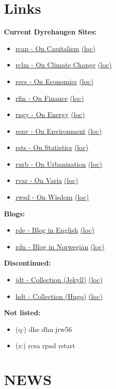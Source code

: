 \documentclass[
]{book}
\providecommand{\tightlist}{%
  \setlength{\itemsep}{0pt}\setlength{\parskip}{0pt}}
\begin{document}
\hypertarget{links}{%
\chapter{Links}\label{links}}

\textbf{Current Dyrehaugen Sites:}

\begin{itemize}
\tightlist
\item
  \href{https://dyrehaugen.github.io/rcap}{rcap - On Capitalism} \href{http://localhost/rcap}{(loc)}
\item
  \href{https://dyrehaugen.github.io/rclm}{rclm - On Climate Change} \href{http://localhost/rclm}{(loc)}
\item
  \href{https://dyrehaugen.github.io/recs}{recs - On Economics} \href{http://localhost/recs}{(loc)}
\item
  \href{https://dyrehaugen.github.io/rngy}{rfin - On Finance} \href{http://localhost/rfin}{(loc)}
\item
  \href{https://dyrehaugen.github.io/rngy}{rngy - On Energy} \href{http://localhost/rngy}{(loc)}
\item
  \href{https://dyrehaugen.github.io/renv}{renv - On Environment} \href{http://localhost/renv}{(loc)}
\item
  \href{https://dyrehaugen.github.io/rsts}{rsts - On Statistics} \href{http://localhost/rsts}{(loc)}
\item
  \href{https://dyrehaugen.github.io/rurb}{rurb - On Urbanization} \href{http://localhost/rurb}{(loc)}
\item
  \href{https://dyrehaugen.github.io/rvar}{rvar - On Varia} \href{http://localhost/rvar}{(loc)}
\item
  \href{https://dyrehaugen.github.io/rwsd}{rwsd - On Wisdom} \href{http://localhost/rwsd}{(loc)}
\end{itemize}

\textbf{Blogs:}

\begin{itemize}
\tightlist
\item
  \href{https://dyrehaugen.github.io/rde}{rde - Blog in English} \href{http://localhost/rde}{(loc)}
\item
  \href{https://dyrehaugen.github.io/rdn}{rdn - Blog in Norwegian} \href{http://localhost/rdn}{(loc)}
\end{itemize}

\textbf{Discontinued:}

\begin{itemize}
\tightlist
\item
  \href{https://dyrehaugen.github.io/jdt}{jdt - Collection (Jekyll)} \href{http://localhost/jdt}{(loc)}
\item
  \href{https://dyrehaugen.github.io/hdt}{hdt - Collection (Hugo)} \href{http://localhost/hdt}{(loc)}
\end{itemize}

\textbf{Not listed:}

\begin{itemize}
\tightlist
\item
  (q:) dhe dhn jrw56
\item
  (z:) rcsa rpad rstart
\end{itemize}

\hypertarget{news}{%
\chapter{NEWS}\label{news}}

  
\end{document}
